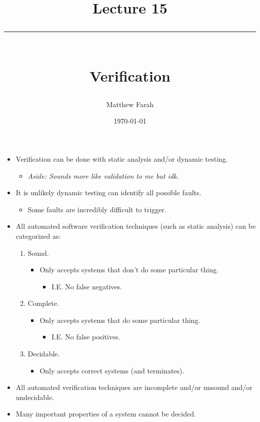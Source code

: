 \documentclass{article}
\date{
	\vspace{-.75em}
	{\large \today}
}
\title{
	\vspace*{-1.5em}
	{\Huge Lecture 15} \\
	\vspace{-1em}
	\rule{\textwidth/4}{.01em} \\
	\vspace{-.25em}
	{\Large Verification}
	\vspace{-.75em}
}
\author{
	{\large Matthew Farah}
}
\begin{document}
\maketitle
\pagestyle{fancy}

\fi

\begin{itemize}
	\item Verification can be done with static analysis and/or dynamic testing.
	\begin{itemize}
		\item \emph{Aside: Sounds more like validation to me but idk.}
	\end{itemize}
	\item It is unlikely dynamic testing can identify all possible faults.
	\begin{itemize}
		\item Some faults are incredibly difficult to trigger.
	\end{itemize}
	\item All automated software verification techniques (such as static analysis) can be categorized as:
	\begin{enumerate}
		\item Sound.
		\begin{itemize}
			\item Only accepts systems that don't do some particular thing.
			\begin{itemize}
				\item I.E. No false negatives.
			\end{itemize}
		\end{itemize}
		\item Complete.
		\begin{itemize}
			\item Only accepts systems that do some particular thing.
			\begin{itemize}
				\item I.E. No false positives.
			\end{itemize}
		\end{itemize}
		\item Decidable.
		\begin{itemize}
			\item Only accepts correct systems (and terminates).
		\end{itemize}
	\end{enumerate}
	\item All automated verification techniques are incomplete and/or unsound and/or undecidable.
	\item Many important properties of a system cannot be decided.

\end{itemize}
\end{document}
